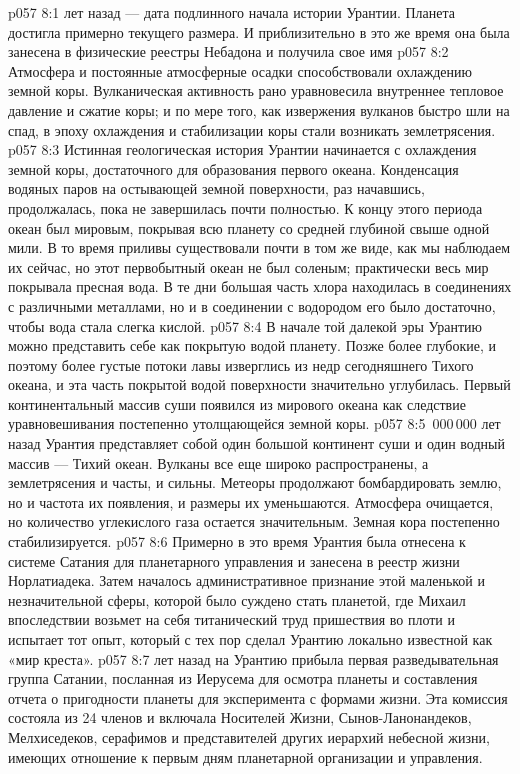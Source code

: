 \vs p057 8:1  лет назад --- дата подлинного начала истории Урантии. Планета достигла примерно текущего размера. И приблизительно в это же время она была занесена в физические реестры Небадона и получила свое имя 
\vs p057 8:2 Атмосфера и постоянные атмосферные осадки способствовали охлаждению земной коры. Вулканическая активность рано уравновесила внутреннее тепловое давление и сжатие коры; и по мере того, как извержения вулканов быстро шли на спад, в эпоху охлаждения и стабилизации коры стали возникать землетрясения.
\vs p057 8:3 Истинная геологическая история Урантии начинается с охлаждения земной коры, достаточного для образования первого океана. Конденсация водяных паров на остывающей земной поверхности, раз начавшись, продолжалась, пока не завершилась почти полностью. К концу этого периода океан был мировым, покрывая всю планету со средней глубиной свыше одной мили. В то время приливы существовали почти в том же виде, как мы наблюдаем их сейчас, но этот первобытный океан не был соленым; практически весь мир покрывала пресная вода. В те дни большая часть хлора находилась в соединениях с различными металлами, но и в соединении с водородом его было достаточно, чтобы вода стала слегка кислой.
\vs p057 8:4 В начале той далекой эры Урантию можно представить себе как покрытую водой планету. Позже более глубокие, и поэтому более густые потоки лавы изверглись из недр сегодняшнего Тихого океана, и эта часть покрытой водой поверхности значительно углубилась. Первый континентальный массив суши появился из мирового океана как следствие уравновешивания постепенно утолщающейся земной коры.
\vs p057 8:5 \,000\,000 лет назад Урантия представляет собой один большой континент суши и один водный массив --- Тихий океан. Вулканы все еще широко распространены, а землетрясения и часты, и сильны. Метеоры продолжают бомбардировать землю, но и частота их появления, и размеры их уменьшаются. Атмосфера очищается, но количество углекислого газа остается значительным. Земная кора постепенно стабилизируется.
\vs p057 8:6 Примерно в это время Урантия была отнесена к системе Сатания для планетарного управления и занесена в реестр жизни Норлатиадека. Затем началось административное признание этой маленькой и незначительной сферы, которой было суждено стать планетой, где Михаил впоследствии возьмет на себя титанический труд пришествия во плоти и испытает тот опыт, который с тех пор сделал Урантию локально известной как «мир креста».
\vs p057 8:7 \pc {} лет назад на Урантию прибыла первая разведывательная группа Сатании, посланная из Иерусема для осмотра планеты и составления отчета о пригодности планеты для эксперимента с формами жизни. Эта комиссия состояла из 24 членов и включала Носителей Жизни, Сынов\hyp{}Ланонандеков, Мелхиседеков, серафимов и представителей других иерархий небесной жизни, имеющих отношение к первым дням планетарной организации и управления.
